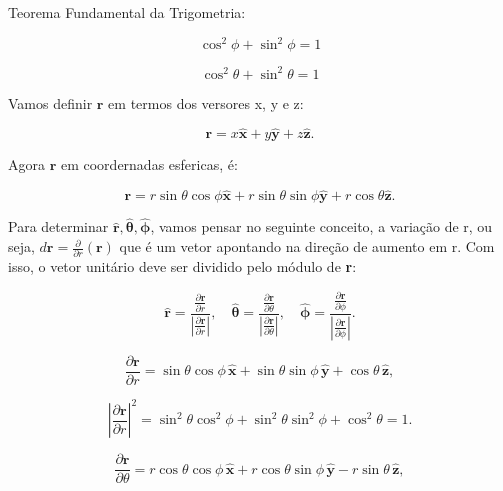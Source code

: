 \documentclass[a4paper,12pt]{article}
\begin{document}
Teorema Fundamental da Trigometria: 

$$\boxed{\cos^{2}\phi + \sin^{2}\phi = 1}$$

$$\boxed{\cos^{2}\theta + \sin^{2}\theta = 1}$$

Vamos definir $\mathbf{r}$ em termos dos versores x, y e z:

\begin{equation}
    \mathbf{r} = x \hat{\mathbf{x}} + y \hat{\mathbf{y}} + z \hat{\mathbf{z}}.
\end{equation}

Agora $\mathbf{r}$ em coordernadas esfericas, \'e:

\begin{equation}\label{eq:r_xyz}
    \mathbf{r} = r\sin{\theta}\cos{\phi} \hat{\mathbf{x}} + r\sin{\theta}\sin{\phi} \hat{\mathbf{y}} + r\cos{\theta} \hat{\mathbf{z}}.
\end{equation}

Para determinar \( \hat{\mathbf{r}}, \hat{\bm{\theta}}, \hat{\bm{\phi}} \), vamos pensar no seguinte conceito, a varia\c{c}\~ao
de r, ou seja, $d\textbf{r} = \frac{\partial}{\partial r}(\textbf{r})$ que \'e um vetor apontando na dire\c{c}\~ao de aumento em r. Com isso,
o vetor unit\'ario deve ser dividido pelo m\'odulo de \textbf{r}:

\begin{equation}
\hat{\mathbf{r}} = \frac{\frac{\partial \mathbf{r}}{\partial r}}{\left| \frac{\partial \mathbf{r}}{\partial r} \right|}, \quad
\hat{\bm{\theta}} = \frac{\frac{\partial \mathbf{r}}{\partial \theta}}{\left| \frac{\partial \mathbf{r}}{\partial \theta} \right|}, \quad
\hat{\bm{\phi}} = \frac{\frac{\partial \mathbf{r}}{\partial \phi}}{\left| \frac{\partial \mathbf{r}}{\partial \phi} \right|}.
\end{equation}

\begin{equation}
\frac{\partial \mathbf{r}}{\partial r} = \sin\theta \cos\phi \, \hat{\mathbf{x}} + \sin\theta \sin\phi \, \hat{\mathbf{y}} + \cos\theta \, \hat{\mathbf{z}},
\end{equation}

\begin{equation}
\left| \frac{\partial \mathbf{r}}{\partial r} \right|^2 = \sin^2\theta \cos^2\phi + \sin^2\theta \sin^2\phi + \cos^2\theta = 1.
\end{equation}

\begin{equation}
\frac{\partial \mathbf{r}}{\partial \theta} = r \cos\theta \cos\phi \, \hat{\mathbf{x}} + r \cos\theta \sin\phi \, \hat{\mathbf{y}} - r \sin\theta \, \hat{\mathbf{z}},
\end{equation}
\end{document}
